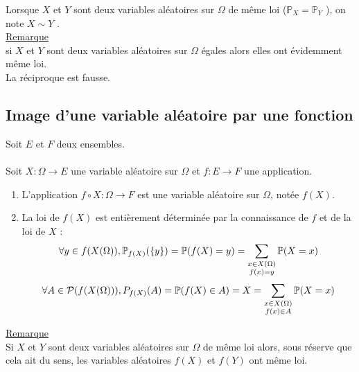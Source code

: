 \begin{nota}
    Lorsque \(X\) et \(Y\) sont deux variables aléatoires sur \(\Omega\) de même loi (\ie \(\mathbb{P}_{X} = \mathbb{P}_{Y}\) ), on note \(X \sim Y\) .\\
    \underline{Remarque}\\ 
    si \(X\) et \(Y\) sont deux variables aléatoires sur \(\Omega\) égales alors elles ont évidemment même loi. \\
    La réciproque est fausse.
\end{nota}
\subsection{Image d’une variable aléatoire par une fonction}
\begin{defprop}
    Soit \(E\) et \(F\) deux ensembles.\\~\\
    Soit \(X : \Omega \to E\) une variable aléatoire sur \(\Omega\) et \(f : E \to F\) une application.
    \begin{enumerate}
        \item L’application \(f \circ X : \Omega \to F\) est une variable aléatoire sur \(\Omega\), notée \(f (X)\).
        \item La loi de \(f (X) \) est entièrement déterminée par la connaissance de \(f\) et de la loi de \(X\) :
            \[\forall y \in  f (X (\Omega)) , \mathbb{P}_{f (X)} (\accol{y}) = \mathbb{P}(f (X) = y) = \sum_{\substack{x\in X(\Omega)\\ f(x)=y}}\mathbb{P} (X = x)\]
            \[\forall A \in  \cal{P} (f (X (\Omega))) , P_{f (X)} (A) = \mathbb{P} (f (X) \in  A) = X = \sum_{\substack{x\in X(\Omega) \\ f (x)\in A }}\mathbb{P} (X = x)\]
    \end{enumerate}
    \underline{Remarque}\\
    Si \(X\) et \(Y\) sont deux variables aléatoires sur \(\Omega\) de même loi alors, sous réserve que cela ait du sens, les variables aléatoires \(f (X)\) et \(f (Y )\) ont même loi.
\end{defprop}

